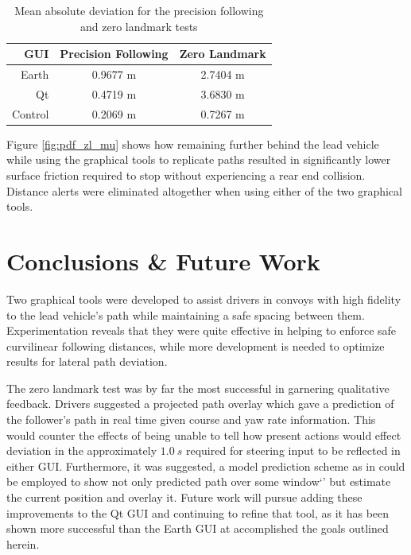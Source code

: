 \documentclass[twocolumn,10pt]{article}
\begin{document}
    \begin{table}[htbp] \centering
      \caption{Mean absolute deviation for the precision following and zero landmark tests}
      \begin{tabular}{r|c|c|} 
        GUI&         Precision Following & Zero Landmark \\
        \hline
        Earth&      0.9677 m & 2.7404 m \\
        Qt&         0.4719 m & 3.6830 m \\
        Control&    0.2069 m & 0.7267 m \\ \hline 
      \end{tabular}
      \label{tab:dev_mean}
    \end{table}
    
    Figure \ref{fig:pdf_zl_mu} shows how remaining further behind the lead vehicle while using the graphical tools to replicate paths resulted in significantly lower surface friction required to stop without experiencing a rear end collision. Distance alerts were eliminated altogether when using either of the two graphical tools.




\section*{Conclusions \& Future Work}

  Two graphical tools were developed to assist drivers in convoys with high fidelity to the lead vehicle's path while maintaining a safe spacing between them.  Experimentation reveals that they were quite effective in helping to enforce safe curvilinear following distances, while more development is needed to optimize results for lateral path deviation.  

  The zero landmark test was by far the most successful in garnering qualitative feedback.  Drivers suggested a projected path overlay which gave a prediction of the follower's path in real time given course and yaw rate information.  This would counter the effects of being unable to tell how present actions would effect deviation in the approximately $1.0~s$ required for steering input to be reflected in either GUI.  Furthermore, it was suggested, a model prediction scheme as in \cite{williamthesis} could be employed to show not only predicted path over some window`' but estimate the current position and overlay it.  Future work will pursue adding these improvements to the Qt GUI and continuing to refine that tool, as it has been shown more successful than the Earth GUI at accomplished the goals outlined herein.
\end{document}
